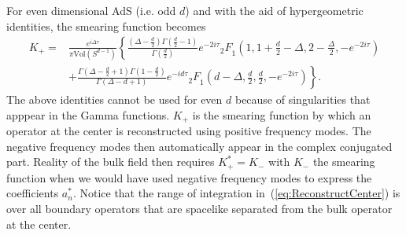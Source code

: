 \documentclass{PoS}
\newcommand{\LF}{\left(}
\newcommand{\RF}{\right)}
\begin{document}
For even dimensional AdS (i.e. odd $d$) and with the aid of hypergeometric identities, the smearing function becomes
\begin{align}
K_+  =& \frac{e^{i\Delta \tau}}{\pi \text{Vol}(S^{d-1}) }\left\{ \frac{\LF \Delta -\frac{d}{2}\RF\Gamma \LF \frac{d}{2}-1\RF}{\Gamma\LF \frac{d}{2}\RF} e^{-2i\tau} \left._2 F\right._1\LF 1,1+\frac{d}{2}-\Delta, 2-\frac{\Delta}{2},-e^{-2i\tau}\RF\right.\nonumber\\
& \left. + \frac{\Gamma\LF \Delta-\frac{d}{2}+1\RF \Gamma \LF 1- \frac{d}{2}\RF}{\Gamma\LF \Delta - d+1\RF} e^{-id\tau}\left._2 F \right._1 \LF d-\Delta,\frac{d}{2},\frac{d}{2},-e^{-2i\tau}\RF\right\}.
\end{align} 
The above identities cannot be used for even $d$ because of singularities that apppear in the Gamma functions. $K_+$ is the smearing function by which an operator at the center is reconstructed using positive frequency modes. The negative frequency modes then automatically appear in the complex conjugated part. Reality of the bulk field then requires $K_+^*=K_-$ with $K_-$ the smearing function when we would have used negative frequency modes to express the coefficients $a^*_n$. Notice that the range of integration in~(\ref{eq:ReconstructCenter}) is over all boundary operators that are spacelike separated from the bulk operator at the center.\\
\end{document}

